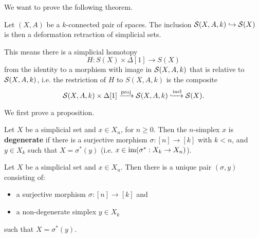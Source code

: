 We want to prove the following theorem.

\begin{theorem**}
Let $(X,A)$ be a $k$-connected pair of spaces. The inclusion $\S(X,A,k)\hto\S(X)$ is then a deformation retraction of simplicial sets.
\end{theorem**}

This means there is a simplicial homotopy
\[H:S(X)\times\Delta[1]\to S(X)\]
from the identity to a morphism with image in $\S(X,A,k)$ that is relative to $\S(X,A,k)$, i.e. the restriction of $H$ to $S(X,A,k)$ is the composite
\[\S(X,A,k)\times\Delta[1]\xto{\text{proj}}\S(X,A,k)\xhto{\text{incl}}\S(X).\]

We first prove a proposition.

Let $X$ be a simplicial set and $x\in X_n$, for $n\geq0$. Then the $n$-simplex $x$ is \textbf{degenerate} if there is a surjective morphism $\sigma:[n]\to [k]$ with $k<n$, and $y\in X_k$ such that $X=\sigma^*(y)$ (i.e. $x\in\im(\sigma^*:X_k\to X_n)$).

\begin{proposition}
Let $X$ be a simplicial set and $x\in X_n$. Then there is a unique pair $(\sigma,y)$ consisting of:
\begin{itemize}
    \item a surjective morphism $\sigma: [n]\to [k]$ and
    \item a non-degenerate simplex $y\in X_k$
\end{itemize}
such that $X=\sigma^*(y)$.
\end{proposition}

